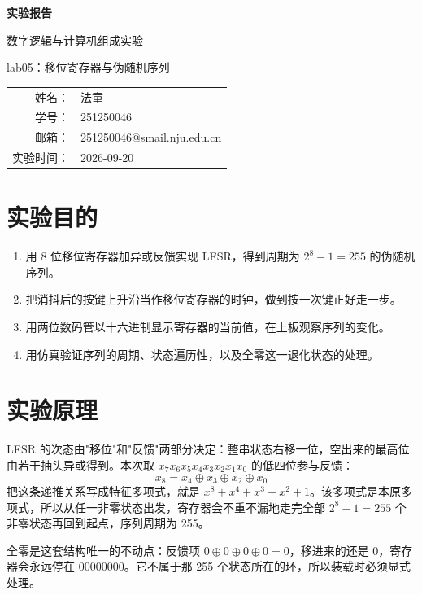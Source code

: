 \documentclass[12pt, a4paper]{ctexart}
\makeatletter
\newcommand{\coursename}{数字逻辑与计算机组成实验}
\newcommand{\expname}{lab05：移位寄存器与伪随机序列}
\newcommand{\expdate}{2026-09-20}
\newcommand{\stuname}{法童}
\newcommand{\stuid}{251250046}
\newcommand{\stumail}{251250046@smail.nju.edu.cn}
\makeatother
\begin{document}
\begin{titlepage}
    \centering
    \vspace*{4cm}
    {\Huge\bfseries 实验报告\par}
    \vspace{1.5cm}
    {\Large \coursename\par}
    \vspace{0.8cm}
    {\Large \expname\par}
    \vspace{3cm}
    {\large
    \begin{tabular}{rl}
        姓名： & \stuname \\
        学号： & \stuid \\
        邮箱： & \stumail \\
        实验时间： & \expdate \\
    \end{tabular}\par}
\end{titlepage}

\section{实验目的}
\begin{enumerate}
    \item 用 8 位移位寄存器加异或反馈实现 LFSR，得到周期为 $2^8-1=255$ 的伪随机序列。
    \item 把消抖后的按键上升沿当作移位寄存器的时钟，做到按一次键正好走一步。
    \item 用两位数码管以十六进制显示寄存器的当前值，在上板观察序列的变化。
    \item 用仿真验证序列的周期、状态遍历性，以及全零这一退化状态的处理。
\end{enumerate}

\section{实验原理}

LFSR 的次态由"移位"和"反馈"两部分决定：整串状态右移一位，空出来的最高位由若干抽头异或得到。本次取 $x_7x_6x_5x_4x_3x_2x_1x_0$ 的低四位参与反馈：
\[
x_8=x_4\oplus x_3\oplus x_2\oplus x_0
\]
把这条递推关系写成特征多项式，就是 $x^8+x^4+x^3+x^2+1$。该多项式是本原多项式，所以从任一非零状态出发，寄存器会不重不漏地走完全部 $2^8-1=255$ 个非零状态再回到起点，序列周期为 255。

全零是这套结构唯一的不动点：反馈项 $0\oplus0\oplus0\oplus0=0$，移进来的还是 0，寄存器会永远停在 00000000。它不属于那 255 个状态所在的环，所以装载时必须显式处理。
\end{document}
